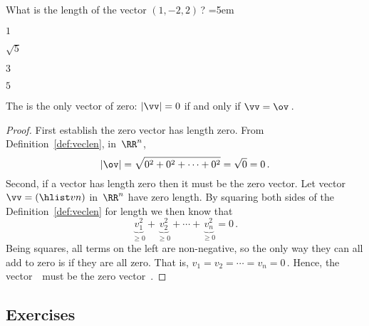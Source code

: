 \begin{activity}
What is the length of the vector \((1,-2,2)\)\,?
\partswidth=5em
\begin{parts}
\item \(1\)
\item \(\sqrt5\)
\item \(3\)
\item \(5\)
\end{parts}
\end{activity}




\begin{theorem} \label{thm:veclen0}
The  is the only vector of  zero:
 \(|\vv|=0\) if and only if \(\vv=\ov\)\,.
\end{theorem}

\begin{proof} 
First establish the zero vector has length zero.
From Definition~\ref{def:veclen}, in~\(\RR^n\),
\begin{equation*}
|\ov|=\sqrt{0^2+0^2+\cdots+0^2}=\sqrt{0}=0\,.
\end{equation*}
Second, if a vector has length zero then it must be the zero vector.
Let vector \(\vv=(\hlist vn)\) in~\(\RR^n\) have zero length.
By squaring both sides of the Definition~\ref{def:veclen} for length we then know that
\begin{equation*}
\underbrace{v_1^2}_{\geq0}+\underbrace{v_2^2}_{\geq0}
+\cdots+\underbrace{v_n^2}_{\geq0}=0\,.
\end{equation*}
Being squares, all terms on the left are non-negative, so the only way they can all add to zero is if they are all zero.
That is, \(v_1=v_2=\cdots=v_n=0\)\,.
Hence, the vector~\vv\ must be the zero vector~\ov.
\end{proof}






\subsection{Exercises}

